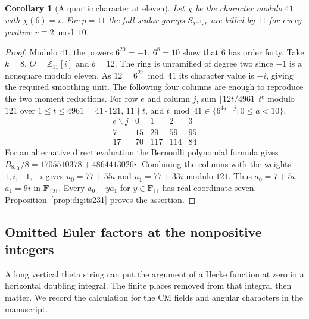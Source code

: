 \documentclass[a4paper,11pt]{article}
\newtheorem{corollary}[proposition]{Corollary}
\theoremstyle{definition}
\theoremstyle{remark}
\newcommand{\ZZ}{\mathbb Z}\newcommand{\ord}{\operatorname{ord}}
\numberwithin{equation}{section}
\begin{document}
\begin{corollary}[A quartic character at eleven]
\label{cor:quartic231}
Let \(\chi\) be the character modulo \(41\) with \(\chi(6)=i\).
For \(p=11\) the full scalar groups \(S_{\chi^{-1},r}\) are
killed by \(11\) for every positive \(r\equiv2\bmod10\).
\end{corollary}
\begin{proof}
Modulo \(41\), the powers \(6^{20}=-1\), \(6^8=10\) show that
\(6\) has order forty. Take \(k=8\), \(O=\ZZ_{11}[i]\) and \(b=12\).
The ring is unramified of degree two since \(-1\) is a nonsquare
modulo eleven. As \(12=6^{27}\bmod41\) its character value is
\(-i\), giving the required smoothing unit. The following four
columns are enough to reproduce the two moment reductions.
For row \(e\) and column \(j\), sum
\(\lfloor12t/4961\rfloor t^e\) modulo \(121\) over
\(1\le t\le4961=41\cdot121\), \(11\nmid t\), and
\(t\bmod41\in\{6^{4a+j}:0\le a<10\}\).
\[
\begin{array}{c|rrrr}
 e\backslash j&0&1&2&3\\ \hline
 7 &15&29&59&95\\
 17&70&117&114&84
\end{array}
\]
For an alternative direct evaluation the Bernoulli polynomial
formula gives
\(B_{8,\chi}/8=1705510378+4864413026i\).
Combining the columns with the weights \(1,i,-1,-i\) gives
\(u_0=77+55i\) and \(u_1=77+33i\) modulo \(121\).
Thus \(a_0=7+5i\), \(a_1=9i\) in \(\mathbf F_{121}\).
Every \(a_0-ya_1\) for \(y\in\mathbf F_{11}\) has real coordinate
seven. Proposition~\ref{prop:digits231} proves the assertion.
\end{proof}

\subsection{Omitted Euler factors at the nonpositive integers}\label{nav:III-43}
A long vertical theta string can put the argument of a Hecke
function at zero in a horizontal doubling integral. The finite
places removed from that integral then matter. We record the
calculation for the CM fields and angular characters in the
manuscript.
\end{document}
